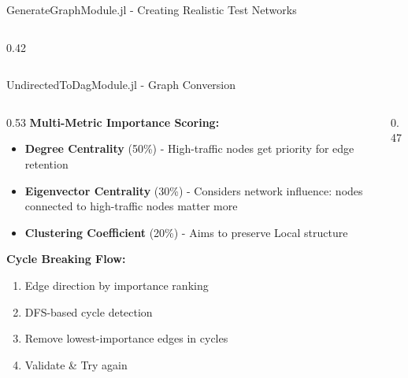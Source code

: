 \documentclass[aspectratio=169]{beamer}
\begin{document}
\begin{frame}{\textcolor{juliagreen}{GenerateGraphModule.jl - Creating Realistic Test Networks}}
\begin{columns}
\begin{column}{0.42\textwidth}

\end{column}
\end{columns}
\end{frame}

\begin{frame}{\textcolor{juliagreen}{UndirectedToDagModule.jl - Graph Conversion}}
\begin{columns}
\begin{column}{0.53\textwidth}
\textbf{Multi-Metric Importance Scoring:}
\begin{itemize}
\item \textcolor{green!70!black}{\textbf{Degree Centrality}} (50\%) -
High-traffic nodes get priority for edge retention
\item \textcolor{green!70!black}{\textbf{Eigenvector Centrality}} (30\%) - Considers network influence:
nodes connected to high-traffic nodes matter more
\item \textcolor{green!70!black}{\textbf{Clustering Coefficient}} (20\%) - Aims to preserve Local structure
\end{itemize}
\vspace{0.3cm}
\textbf{Cycle Breaking Flow:}
\begin{enumerate}
\item Edge direction by importance ranking
\item DFS-based cycle detection
\item Remove lowest-importance edges in cycles
\item Validate \& Try again
\end{enumerate}
\end{column}
\begin{column}{0.47\textwidth}
\centering
{}
\end{column}
\end{columns}
\end{frame}
\end{document}
